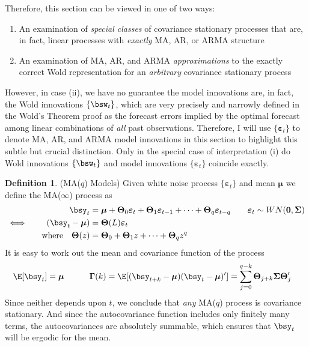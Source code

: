 \documentclass[12pt]{article}
\theoremstyle{plain}
\theoremstyle{definition}
\newtheorem{defn}[thm]{Definition}
\theoremstyle{remark}
\newcommand{\bsTheta}{\boldsymbol{\Theta}}
\newcommand{\bsmu}{\boldsymbol{\mu}}
\newcommand{\bsSigma}{\boldsymbol{\Sigma}}
\newcommand{\bsvarepsilon}{\boldsymbol{\varepsilon}}
\newcommand{\bsGamma}{\boldsymbol{\Gamma}}
\renewcommand{\bso}{\boldsymbol{0}}
\begin{document}
Therefore, this section can be viewed in one of two ways:
\begin{enumerate}[label=(\roman*)]
  \item An examination of \emph{special classes} of covariance
    stationary processes that are, in fact, linear processes with
    \emph{exactly} MA, AR, or ARMA structure
  \item An examination of MA, AR, and ARMA \emph{approximations} to the
    exactly correct Wold representation for an \emph{arbitrary}
    covariance stationary process
\end{enumerate}
However, in case (ii), we have no guarantee the model innovations
are, in fact, the Wold innovations $\{\bsw_t\}$, which are very
precisely and narrowly defined in the Wold's Theorem proof as the
forecast errors implied by the optimal forecast among linear
combinations of \emph{all} past observations.  Therefore, I will use
$\{\bsvarepsilon_t\}$ to denote MA, AR, and ARMA model innovations in
this section to highlight this subtle but crucial distinction.
Only in the special case of interpretation (i) do Wold innovations
$\{\bsw_t\}$ and model innovations $\{\bsvarepsilon_t\}$ coincide
exactly.

\clearpage
\begin{defn}(MA($q$) Models)
Given white noise process $\{\bsvarepsilon_t\}$ and mean $\bsmu$ we
define the MA($\infty$) process as
\begin{align*}
  \bsy_t &=
  \bsmu
  + \bsTheta_0\bsvarepsilon_t
  + \bsTheta_1\bsvarepsilon_{t-1}
  + \cdots
  + \bsTheta_q\bsvarepsilon_{t-q}
  \qquad \bsvarepsilon_t \sim WN(\bso,\bsSigma)
  \\
  \iff\qquad
  (\bsy_t - \bsmu) &= \bsTheta(L)\bsvarepsilon_t
  \\
  \text{where}\quad
  \bsTheta(z)
  &= \bsTheta_0 + \bsTheta_1z + \cdots + \bsTheta_qz^q
\end{align*}
It is easy to work out the mean and covariance function of the process
\begin{align*}
  \E[\bsy_t]
  =\bsmu
  \qquad
  \quad
  \bsGamma(k)
  =
  \E[(\bsy_{t+k}-\bsmu)(\bsy_t-\bsmu)']
  &= \sum_{j=0}^{q-k} \bsTheta_{j+k}\bsSigma\bsTheta_j'
\end{align*}
Since neither depends upon $t$, we conclude that \emph{any} MA($q$)
process is covariance stationary. And since the autocovariance function
includes only finitely many terms, the autocovariances are absolutely
summable, which ensures that $\bsy_t$ will be ergodic for the mean.
\end{defn}
\end{document}
